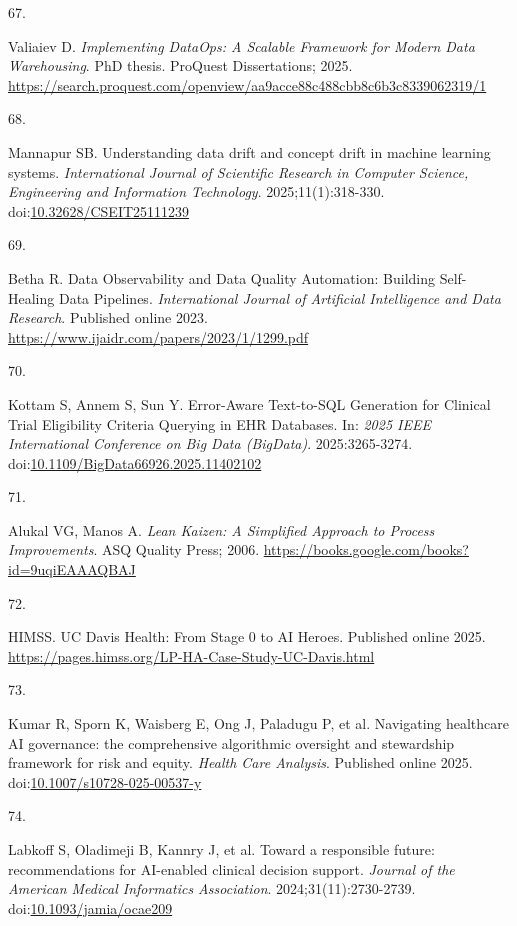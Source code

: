 \documentclass[
  american,
  11pt,
  letterpaper,
  oneside  ,captions=tableheading
]{scrartcl}
\newlength{\cslhangindent}
\newlength{\csllabelwidth}
\newenvironment{CSLReferences}[2] %
 {\begin{list}{}{%
  \setlength{\itemindent}{0pt}
  \setlength{\leftmargin}{0pt}
  \setlength{\parsep}{0pt}
  \ifodd #1
   \setlength{\leftmargin}{\cslhangindent}
   \setlength{\itemindent}{-1\cslhangindent}
  \fi
  \setlength{\itemsep}{#2\baselineskip}}}
 {\end{list}}
\newcommand{\CSLLeftMargin}[1]{\parbox[t]{\csllabelwidth}{\strut#1\strut}}
\newcommand{\CSLRightInline}[1]{\parbox[t]{\linewidth - \csllabelwidth}{\strut#1\strut}}
\begin{document}
\begin{CSLReferences}{0}{1}
\CSLLeftMargin{67. }%
\CSLRightInline{Valiaiev D. \emph{{Implementing DataOps: A Scalable
Framework for Modern Data Warehousing}}. PhD thesis. ProQuest
Dissertations; 2025.
\url{https://search.proquest.com/openview/aa9acce88c488cbb8c6b3c8339062319/1}}

\CSLLeftMargin{68. }%
\CSLRightInline{Mannapur SB. Understanding data drift and concept drift
in machine learning systems. \emph{International Journal of Scientific
Research in Computer Science, Engineering and Information Technology}.
2025;11(1):318-330.
doi:\href{https://doi.org/10.32628/CSEIT25111239}{10.32628/CSEIT25111239}}

\CSLLeftMargin{69. }%
\CSLRightInline{Betha R. {Data Observability and Data Quality
Automation: Building Self-Healing Data Pipelines}. \emph{International
Journal of Artificial Intelligence and Data Research}. Published online
2023. \url{https://www.ijaidr.com/papers/2023/1/1299.pdf}}

\CSLLeftMargin{70. }%
\CSLRightInline{Kottam S, Annem S, Sun Y. {Error-Aware Text-to-SQL
Generation for Clinical Trial Eligibility Criteria Querying in EHR
Databases}. In: \emph{2025 IEEE International Conference on Big Data
(BigData)}. 2025:3265-3274.
doi:\href{https://doi.org/10.1109/BigData66926.2025.11402102}{10.1109/BigData66926.2025.11402102}}

\CSLLeftMargin{71. }%
\CSLRightInline{Alukal VG, Manos A. \emph{Lean Kaizen: A Simplified
Approach to Process Improvements}. ASQ Quality Press; 2006.
\url{https://books.google.com/books?id=9uqiEAAAQBAJ}}

\CSLLeftMargin{72. }%
\CSLRightInline{HIMSS. {UC Davis Health: From Stage 0 to AI Heroes}.
Published online 2025.
\url{https://pages.himss.org/LP-HA-Case-Study-UC-Davis.html}}

\CSLLeftMargin{73. }%
\CSLRightInline{{Kumar R, Sporn K, Waisberg E, Ong J, Paladugu P, et
al.} {Navigating healthcare AI governance: the comprehensive algorithmic
oversight and stewardship framework for risk and equity}. \emph{Health
Care Analysis}. Published online 2025.
doi:\href{https://doi.org/10.1007/s10728-025-00537-y}{10.1007/s10728-025-00537-y}}

\CSLLeftMargin{74. }%
\CSLRightInline{{Labkoff S, Oladimeji B, Kannry J, et al.} {Toward a
responsible future: recommendations for AI-enabled clinical decision
support}. \emph{Journal of the American Medical Informatics
Association}. 2024;31(11):2730-2739.
doi:\href{https://doi.org/10.1093/jamia/ocae209}{10.1093/jamia/ocae209}}


\end{CSLReferences}
\end{document}
